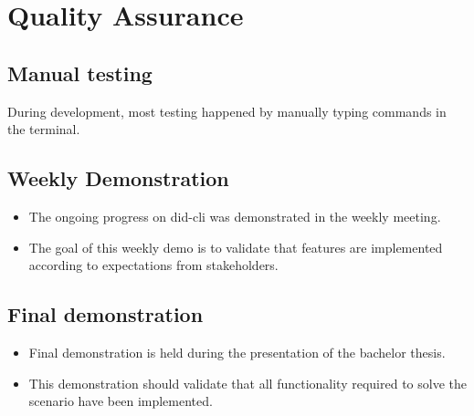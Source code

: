 \chapter{Quality Assurance}

\section{Manual testing}

During development, most testing happened by manually typing commands in the terminal.
 
\section{Weekly Demonstration}

\begin{itemize}
    \item The ongoing progress on \acrshort{did-cli} was demonstrated in the weekly meeting. 
    \item The goal of this weekly demo is to validate that features are implemented according to expectations from stakeholders.
\end{itemize}


\section{Final demonstration}

\begin{itemize}
    \item Final demonstration is held during the presentation of the bachelor thesis.
    \item This demonstration should validate that all functionality required to solve the scenario have been implemented.
\end{itemize}


